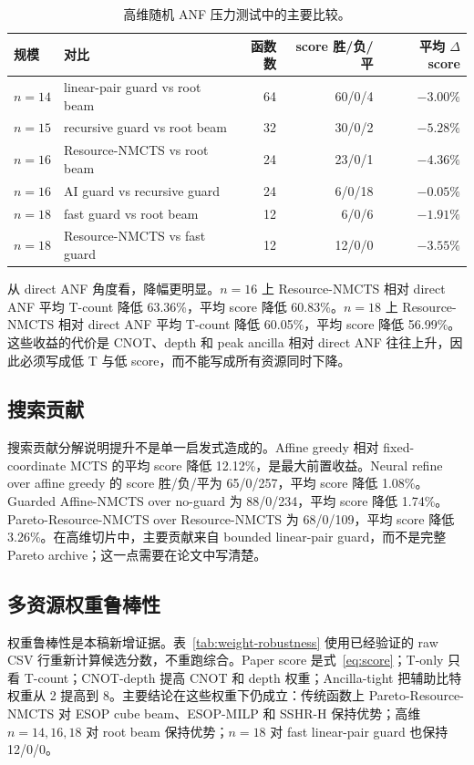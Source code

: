 \documentclass[UTF8,fontset=macnew,11pt]{ctexart}
\newcommand{\method}{Resource-NMCTS}
\newcommand{\pareto}{Pareto-Resource-NMCTS}
\begin{document}
\begin{table}[t]
\centering
\small
\caption{高维随机 ANF 压力测试中的主要比较。}
\label{tab:highdim}
\begin{tabularx}{\linewidth}{llrrr}
\toprule
规模 & 对比 & 函数数 & score 胜/负/平 & 平均 $\Delta$ score \\
\midrule
$n=14$ & linear-pair guard vs root beam & 64 & 60/0/4 & $-3.00\%$ \\
$n=15$ & recursive guard vs root beam & 32 & 30/0/2 & $-5.28\%$ \\
$n=16$ & \method{} vs root beam & 24 & 23/0/1 & $-4.36\%$ \\
$n=16$ & AI guard vs recursive guard & 24 & 6/0/18 & $-0.05\%$ \\
$n=18$ & fast guard vs root beam & 12 & 6/0/6 & $-1.91\%$ \\
$n=18$ & \method{} vs fast guard & 12 & 12/0/0 & $-3.55\%$ \\
\bottomrule
\end{tabularx}
\end{table}

从 direct ANF 角度看，降幅更明显。$n=16$ 上 \method{} 相对 direct ANF 平均 T-count 降低 63.36\%，平均 score 降低 60.83\%。$n=18$ 上 \method{} 相对 direct ANF 平均 T-count 降低 60.05\%，平均 score 降低 56.99\%。这些收益的代价是 CNOT、depth 和 peak ancilla 相对 direct ANF 往往上升，因此必须写成低 T 与低 score，而不能写成所有资源同时下降。

\subsection{搜索贡献}

搜索贡献分解说明提升不是单一启发式造成的。Affine greedy 相对 fixed-coordinate MCTS 的平均 score 降低 12.12\%，是最大前置收益。Neural refine over affine greedy 的 score 胜/负/平为 65/0/257，平均 score 降低 1.08\%。Guarded Affine-NMCTS over no-guard 为 88/0/234，平均 score 降低 1.74\%。\pareto{} over \method{} 为 68/0/109，平均 score 降低 3.26\%。在高维切片中，主要贡献来自 bounded linear-pair guard，而不是完整 Pareto archive；这一点需要在论文中写清楚。

\subsection{多资源权重鲁棒性}

权重鲁棒性是本稿新增证据。表~\ref{tab:weight-robustness} 使用已经验证的 raw CSV 行重新计算候选分数，不重跑综合。Paper score 是式~\eqref{eq:score}；T-only 只看 T-count；CNOT-depth 提高 CNOT 和 depth 权重；Ancilla-tight 把辅助比特权重从 2 提高到 8。主要结论在这些权重下仍成立：传统函数上 \pareto{} 对 ESOP cube beam、ESOP-MILP 和 SSHR-H 保持优势；高维 $n=14,16,18$ 对 root beam 保持优势；$n=18$ 对 fast linear-pair guard 也保持 12/0/0。
\end{document}
